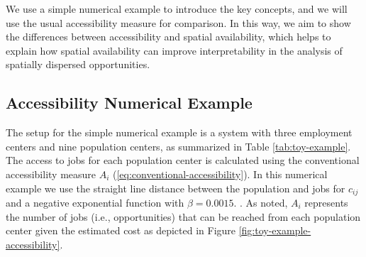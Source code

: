 \documentclass[]{elsarticle} %
\begin{document}
We use a simple numerical example to introduce the key concepts, and we
will use the usual accessibility measure for comparison. In this way, we
aim to show the differences between accessibility and spatial
availability, which helps to explain how spatial availability can
improve interpretability in the analysis of spatially dispersed
opportunities.

\hypertarget{accessibility-numerical-example}{%
\subsection{Accessibility Numerical
Example}\label{accessibility-numerical-example}}

The setup for the simple numerical example is a system with three
employment centers and nine population centers, as summarized in Table
\ref{tab:toy-example}. The access to jobs for each population center is
calculated using the conventional accessibility measure \(A_i\)
(\ref{eq:conventional-accessibility}). In this numerical example we use
the straight line distance between the population and jobs for
\(c_{ij}\) and a negative exponential function with \(\beta = 0.0015\).
. As noted, \(A_i\) represents the number of jobs (i.e., opportunities)
that can be reached from each population center given the estimated cost
as depicted in Figure \ref{fig:toy-example-accessibility}.
\end{document}
